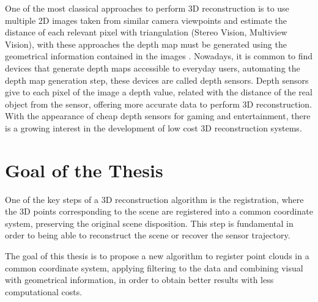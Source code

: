 One of the most classical approaches to perform 3D reconstruction is to use multiple 2D
 images taken from similar camera viewpoints and estimate the distance of each
 relevant pixel with triangulation (Stereo Vision, Multiview Vision), with these 
approaches the depth map must be generated using the geometrical information contained
 in the images \cite{Newcombe10livedense}. Nowadays, it is common to find devices that generate depth maps accessible
 to everyday users, automating the depth map generation step, these devices are called depth sensors. 
Depth sensors give to each pixel of the image a depth value, related
with the distance of the real object from the sensor, offering  more
accurate data to perform 3D reconstruction. With the appearance
of cheap depth sensors for gaming and entertainment, there is a growing interest in the development of low cost
3D reconstruction systems. 


\section{Goal of the Thesis} 

One of the key steps of a 3D reconstruction algorithm is the registration, where the 3D points corresponding to
 the scene are  registered into a common coordinate system, preserving the original scene disposition. This step is 
 fundamental in order to being able to reconstruct the scene or recover the sensor trajectory.

The goal of this thesis is to propose a new algorithm to register point clouds in a common coordinate system, applying 
filtering to the data and combining visual with geometrical information, in order to obtain better results with less 
computational costs. 






